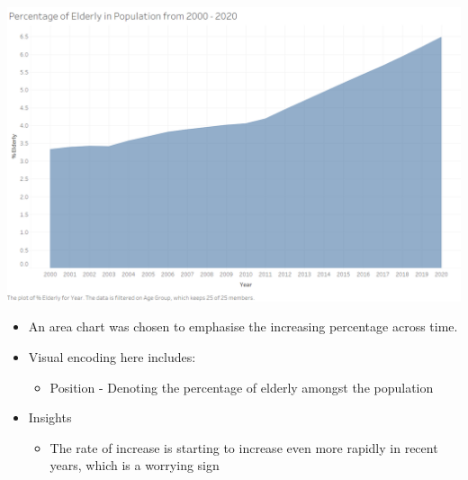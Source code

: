 \documentclass[a4paper, 11pt]{article}
\begin{document}
\begin{center}
\includegraphics[width=.9\linewidth]{./charts/elderly.png}
\end{center}

\begin{itemize}
\item An area chart was chosen to emphasise the increasing percentage across time.
\item Visual encoding here includes:
\begin{itemize}
\item Position - Denoting the percentage of elderly amongst the population
\end{itemize}
\item Insights
\begin{itemize}
\item The rate of increase is starting to increase even more rapidly in recent years, which is a worrying sign
\end{itemize}
\end{itemize}
\end{document}
